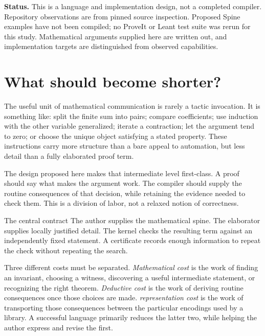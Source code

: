 \documentclass[11pt,letterpaper]{article}
\theoremstyle{definition}
\theoremstyle{remark}
\newcommand{\Spine}{Spine}
\begin{document}
\begin{titlepage}
\begin{abstract}
The proposal includes surface notation, an obligation calculus, a conditional soundness argument, a Lean-native and external-synthesizer integration design, trust profiles, failure diagnostics, and an evaluation protocol. Its central requirement is that shorter source must not be purchased by silently changing a theorem, enlarging its assumptions, or concealing the mathematical choice that explains the proof.
\end{abstract}
\vfill
{\small\noindent\textbf{Status.} This is a language and implementation design, not a completed compiler. Repository observations are from pinned source inspection. Proposed \Spine{} examples have not been compiled; no ProveIt or Leant test suite was rerun for this study. Mathematical arguments supplied here are written out, and implementation targets are distinguished from observed capabilities.}
\end{titlepage}
\tableofcontents
\clearpage

\section{What should become shorter?}
\label{sec:thesis}
The useful unit of mathematical communication is rarely a tactic invocation. It is something like: split the finite sum into pairs; compare coefficients; use induction with the other variable generalized; iterate a contraction; let the argument tend to zero; or choose the unique object satisfying a stated property. These instructions carry more structure than a bare appeal to automation, but less detail than a fully elaborated proof term.

The design proposed here makes that intermediate level first-class. A proof should say what makes the argument work. The compiler should supply the routine consequences of that decision, while retaining the evidence needed to check them. This is a division of labor, not a relaxed notion of correctness.

\begin{principle}{The central contract}
The author supplies the mathematical spine. The elaborator supplies locally justified detail. The kernel checks the resulting term against an independently fixed statement. A certificate records enough information to repeat the check without repeating the search.
\end{principle}

Three different costs must be separated. \emph{Mathematical cost} is the work of finding an invariant, choosing a witness, discovering a useful intermediate statement, or recognizing the right theorem. \emph{Deductive cost} is the work of deriving routine consequences once those choices are made. \emph{representation cost} is the work of transporting those consequences between the particular encodings used by a library. A successful language primarily reduces the latter two, while helping the author express and revise the first.
\end{document}
